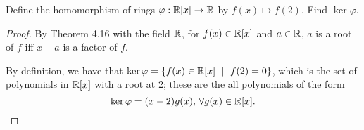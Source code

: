 \documentclass[../hw8]{subfiles}
\begin{document}
\begin{problem}
Define the homomorphism of rings $\varphi : \mathbb{R}[x] \to \mathbb{R}$ by $f(x)\mapsto f(2)$.
Find $\ker{\varphi} $.
\end{problem}
\begin{proof}
	By Theorem 4.16 with the field $\mathbb{R}$, for $f(x)\in \mathbb{R}[x]$ and $a\in \mathbb{R}$,
	$a$ is a root of $f$ iff $x-a$ is a factor of  $f$.

	By definition, we have that $\ker{\varphi}=\{f(x) \in \R[x]\ \mid\ f(2)=0\}$,
	which is the set of polynomials in $\mathbb{R}[x]$ with a root at 2;
	these are the all polynomials of the form \[
		\ker{\varphi}= (x-2)g(x),\, \forall g(x)\in \mathbb{R}[x]
		.\]
\end{proof}
\end{document}

